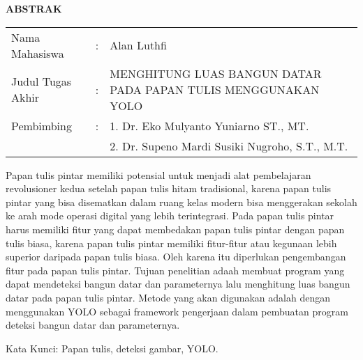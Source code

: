 \begin{center}
  \large\textbf{ABSTRAK}
\end{center}


\vspace{2ex}

\begingroup
  \setlength{\tabcolsep}{0pt}

  \noindent
  \begin{tabularx}{\textwidth}{l >{\centering}m{2em} X}
    Nama Mahasiswa    &:& Alan Luthfi \\

    Judul Tugas Akhir &:&	{MENGHITUNG LUAS BANGUN DATAR PADA PAPAN TULIS MENGGUNAKAN YOLO} \\

    Pembimbing        &:& 1. Dr. Eko Mulyanto Yuniarno ST., MT. \\
                      & & 2. Dr. Supeno Mardi Susiki Nugroho, S.T., M.T. \\
  \end{tabularx}
\endgroup

Papan tulis pintar memiliki potensial untuk menjadi alat pembelajaran revolusioner kedua
setelah papan tulis hitam tradisional, karena papan tulis pintar yang bisa disematkan dalam
ruang kelas modern bisa menggerakan sekolah ke arah mode operasi digital yang lebih terintegrasi. Pada papan tulis pintar harus memiliki fitur yang dapat membedakan papan tulis pintar
dengan papan tulis biasa, karena papan tulis pintar memiliki fitur-fitur atau kegunaan lebih
superior daripada papan tulis biasa. Oleh karena itu diperlukan pengembangan fitur pada papan tulis pintar. Tujuan penelitian adaah membuat program yang dapat mendeteksi bangun
datar dan parameternya lalu menghitung luas bangun datar pada papan tulis pintar. Metode
yang akan digunakan adalah dengan menggunakan YOLO sebagai framework pengerjaan dalam
pembuatan program deteksi bangun datar dan parameternya.

Kata Kunci: Papan tulis, deteksi gambar, YOLO.
